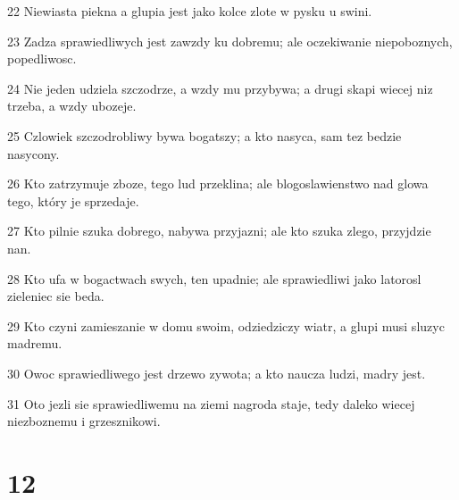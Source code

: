 \par 22 Niewiasta piekna a glupia jest jako kolce zlote w pysku u swini.
\par 23 Zadza sprawiedliwych jest zawzdy ku dobremu; ale oczekiwanie niepoboznych, popedliwosc.
\par 24 Nie jeden udziela szczodrze, a wzdy mu przybywa; a drugi skapi wiecej niz trzeba, a wzdy ubozeje.
\par 25 Czlowiek szczodrobliwy bywa bogatszy; a kto nasyca, sam tez bedzie nasycony.
\par 26 Kto zatrzymuje zboze, tego lud przeklina; ale blogoslawienstwo nad glowa tego, który je sprzedaje.
\par 27 Kto pilnie szuka dobrego, nabywa przyjazni; ale kto szuka zlego, przyjdzie nan.
\par 28 Kto ufa w bogactwach swych, ten upadnie; ale sprawiedliwi jako latorosl zieleniec sie beda.
\par 29 Kto czyni zamieszanie w domu swoim, odziedziczy wiatr, a glupi musi sluzyc madremu.
\par 30 Owoc sprawiedliwego jest drzewo zywota; a kto naucza ludzi, madry jest.
\par 31 Oto jezli sie sprawiedliwemu na ziemi nagroda staje, tedy daleko wiecej niezboznemu i grzesznikowi.

\chapter{12}

